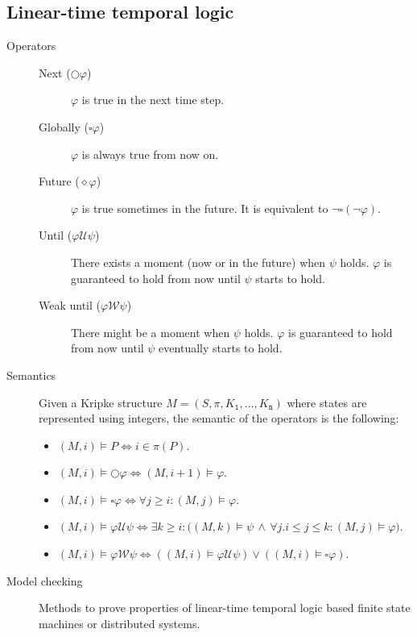 \subsection{Linear-time temporal logic}

\begin{description}
    \item[Operators] \phantom{}
        \begin{description}
            \item[Next ($\bigcirc \varphi$)] 
                $\varphi$ is true in the next time step.

            \item[Globally ($\square \varphi$)] 
                $\varphi$ is always true from now on.

            \item[Future ($\diamond \varphi$)] 
                $\varphi$ is true sometimes in the future.
                It is equivalent to $\lnot\square(\lnot \varphi)$.

            \item[Until ($\varphi \mathcal{U} \psi$)] 
                There exists a moment (now or in the future) when $\psi$ holds. 
                $\varphi$ is guaranteed to hold from now until $\psi$ starts to hold.

            \item[Weak until ($\varphi \mathcal{W} \psi$)] 
                There might be a moment when $\psi$ holds. 
                $\varphi$ is guaranteed to hold from now until $\psi$ eventually starts to hold.
        \end{description}

    \item[Semantics]
        Given a Kripke structure $M = (S, \pi, K_\texttt{1}, \dots, K_\texttt{n})$ where states are represented using integers,
        the semantic of the operators is the following:
        \begin{itemize}
            \item $(M, i) \models P \iff i \in \pi(P)$.
            \item $(M, i) \models \bigcirc\varphi \iff (M, i+1) \models \varphi$.
            \item $(M, i) \models \square\varphi \iff \forall j \geq i: (M, j) \models \varphi$.
            \item $(M, i) \models \varphi \mathcal{U} \psi \iff \exists k \geq i: \big( (M, k) \models \psi \,\land\, \forall j. i \leq j \leq k: (M, j) \models \varphi \big)$.
            \item $(M, i) \models \varphi \mathcal{W} \psi \iff ((M, i) \models \varphi \mathcal{U} \psi) \vee ((M, i) \models \square\varphi)$.
        \end{itemize}

    \item[Model checking] 
        Methods to prove properties of linear-time temporal logic based finite state machines or distributed systems.
\end{description}